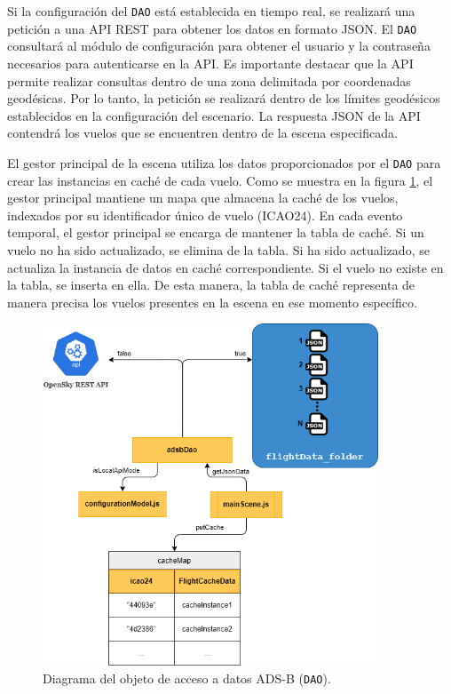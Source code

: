 \documentclass[a4paper, 11pt]{book}
\begin{document}
Si la configuración del \texttt{DAO} está establecida en tiempo real, se realizará una petición a una \textsc{API REST} para obtener los datos en formato \textsc{JSON}. El \texttt{DAO} consultará al módulo de configuración para obtener el usuario y la contraseña necesarios para autenticarse en la \textsc{API}. Es importante destacar que la API permite realizar consultas dentro de una zona delimitada por coordenadas geodésicas. 
Por lo tanto, la petición se realizará dentro de los límites geodésicos establecidos en la configuración del escenario. La respuesta \textsc{JSON} de la \textsc{API} contendrá los vuelos que se encuentren dentro de la escena especificada.

El gestor principal de la escena utiliza los datos proporcionados por el \texttt{DAO} para crear las instancias en caché de cada vuelo. Como se muestra en la figura \ref{fig:dao}, el gestor principal mantiene un mapa que almacena la caché de los vuelos, indexados por su identificador único de vuelo (\textsc{ICAO24}). En cada evento temporal, el gestor principal se encarga de mantener la tabla de caché. Si un vuelo no ha sido actualizado, se elimina de la tabla. Si ha sido actualizado, se actualiza la instancia de datos en caché correspondiente. Si el vuelo no existe en la tabla, se inserta en ella. De esta manera, la tabla de caché representa de manera precisa los vuelos presentes en la escena en ese momento específico.

\begin{figure}[h]
  \centering
  \includegraphics[width=10cm, keepaspectratio]{img/adsbDao.png}
  \caption{Diagrama del objeto de acceso a datos \textsc{ADS-B} (\texttt{DAO}).}
  \label{fig:dao}
\end{figure}
\end{document}
